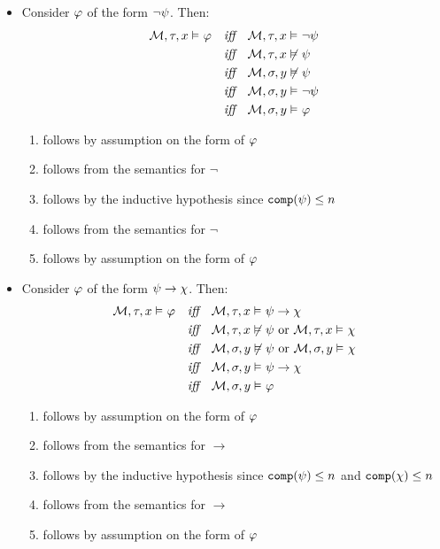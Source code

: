 \documentclass[a4paper, 11pt]{article}                  %
\begin{document}
\begin{enumerate}
{        \begin{itemize}
          \item Consider $\varphi$ of the form $\lnot \psi$. Then:
          \setcounter{equation}{0}
          \begin{align}
            \mathcal{M}, \tau, x \vDash_{} \varphi \quad \textit{iff}\quad & \mathcal{M}, \tau, x \vDash_{} \lnot\psi\\
            \textit{iff}\quad & \mathcal{M}, \tau, x \not\vDash_{} \psi\\
            \textit{iff}\quad & \mathcal{M}, \sigma, y \not\vDash_{} \psi\\
            \textit{iff}\quad & \mathcal{M}, \sigma, y \vDash_{} \lnot\psi\\
            \textit{iff}\quad & \mathcal{M}, \sigma, y \vDash_{} \varphi
          \end{align}
          \begin{enumerate}[label=(\arabic*)]
            \item follows by assumption on the form of $\varphi$
            \item follows from the semantics for $\lnot$
            \item follows by the inductive hypothesis since $\texttt{comp}(\psi) \le n$
            \item follows from the semantics for $\lnot$
            \item follows by assumption on the form of $\varphi$
          \end{enumerate}

          \item Consider $\varphi$ of the form $\psi \to \chi$. Then:
          \setcounter{equation}{0}
          \begin{align}
            \mathcal{M}, \tau, x \vDash_{} \varphi \quad \textit{iff}\quad & \mathcal{M}, \tau, x \vDash_{} \psi\to\chi\\
            \textit{iff}\quad & \mathcal{M}, \tau, x \not\vDash_{} \psi \text{ or } \mathcal{M}, \tau, x \vDash_{} \chi \\
            \textit{iff}\quad & \mathcal{M}, \sigma, y \not\vDash_{} \psi \text{ or } \mathcal{M}, \sigma, y \vDash_{} \chi \\
            \textit{iff}\quad & \mathcal{M}, \sigma, y \vDash_{} \psi \to \chi\\
            \textit{iff}\quad & \mathcal{M}, \sigma, y \vDash_{} \varphi
          \end{align}
          \begin{enumerate}[label=(\arabic*)]
            \item follows by assumption on the form of $\varphi$
            \item follows from the semantics for $\to$
            \item follows by the inductive hypothesis since $\texttt{comp}(\psi) \le n$ and $\texttt{comp}(\chi) \le n$
            \item follows from the semantics for $\to$
            \item follows by assumption on the form of $\varphi$
          \end{enumerate}


\end{itemize}}
\end{enumerate}
\end{document}
